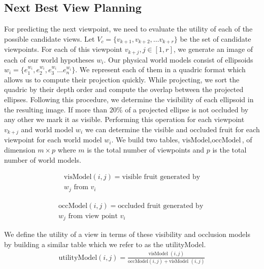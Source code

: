 \subsection{Next Best View Planning}\label{subsec:nbv}

For predicting the next viewpoint, we need to evaluate the utility of each of the possible candidate views. Let $V_c =\{ v_{k+1}, v_{k+2}, \ldots v_{k+r}\}$ be the set of candidate viewpoints. For each of this viewpoint $v_{k+j}, j\in [1,r]$, we generate an image of each of our world hypotheses $w_i$. Our physical world models consist of ellipsoids $w_i = \{ e_1^{w_i}, e_2^{w_i},e_3^{w_i} \ldots e_n^{w_i} \}$. We represent each of them in a quadric format which allows us to compute their projection quickly. While projecting, we sort the quadric by their depth order and compute the overlap between the projected ellipses. Following this procedure, we determine the visibility of each ellipsoid in the resulting image. If more than $20\%$ of a projected ellipse is not occluded by any other we mark it as visible. Performing this operation for each viewpoint $v_{k+j}$ and world model $w_i$ we can determine the visible and occluded fruit for each viewpoint for each world model $w_i$. We build two tables, $\text{visModel}, \text{occModel}$, of dimension $m \times p$ where $m$ is the total number of viewpoints and $p$ is the total number of world models. 

\begin{equation*}
\begin{split}
\text{visModel}(i,j) = \text{visible fruit generated by}\\ w_j \text{ from } v_i 
\end{split}
\end{equation*}

\begin{equation*}
\begin{split}
\text{occModel}(i,j) = \text{occluded fruit generated by }\\ w_j \text{ from view point } v_i 
\end{split}
\end{equation*}

We define the utility of a view in terms of these visibility and occlusion models by building a similar table which we refer to as the utilityModel.
\begin{equation*}
\begin{split}
\text{utilityModel}(i,j) = \frac{\text{visModel }(i,j)}{\text{occModel}(i,j) + \text{visModel }(i,j) } 
\end{split}
\end{equation*}

